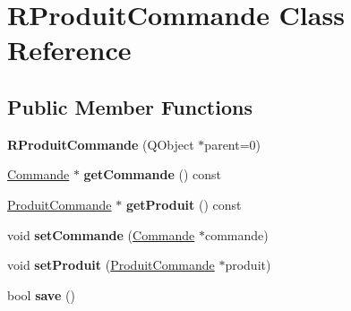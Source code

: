 \hypertarget{class_r_produit_commande}{
\section{RProduitCommande Class Reference}
\label{class_r_produit_commande}
}
\subsection*{Public Member Functions}
\begin{DoxyCompactItemize}
\item 
\hypertarget{class_r_produit_commande_a47655dcac0a8d03c07dc1e7c6ce6f094}{
{\bfseries RProduitCommande} (QObject $\ast$parent=0)}
\label{class_r_produit_commande_a47655dcac0a8d03c07dc1e7c6ce6f094}

\item 
\hypertarget{class_r_produit_commande_a5290a6960e10d41556d204a5842748b0}{
\hyperlink{class_commande}{Commande} $\ast$ {\bfseries getCommande} () const }
\label{class_r_produit_commande_a5290a6960e10d41556d204a5842748b0}

\item 
\hypertarget{class_r_produit_commande_aabe48dc4c831017e8a959fcfc7e2b9e1}{
\hyperlink{class_produit_commande}{ProduitCommande} $\ast$ {\bfseries getProduit} () const }
\label{class_r_produit_commande_aabe48dc4c831017e8a959fcfc7e2b9e1}

\item 
\hypertarget{class_r_produit_commande_ab008cab70aa37ddd04f47dcc7ffce729}{
void {\bfseries setCommande} (\hyperlink{class_commande}{Commande} $\ast$commande)}
\label{class_r_produit_commande_ab008cab70aa37ddd04f47dcc7ffce729}

\item 
\hypertarget{class_r_produit_commande_ac294151535a25d1c6251289b46c37b1c}{
void {\bfseries setProduit} (\hyperlink{class_produit_commande}{ProduitCommande} $\ast$produit)}
\label{class_r_produit_commande_ac294151535a25d1c6251289b46c37b1c}

\item 
\hypertarget{class_r_produit_commande_aca6f81036cc375d36782294338dafe08}{
bool {\bfseries save} ()}
\label{class_r_produit_commande_aca6f81036cc375d36782294338dafe08}

\end{DoxyCompactItemize}
